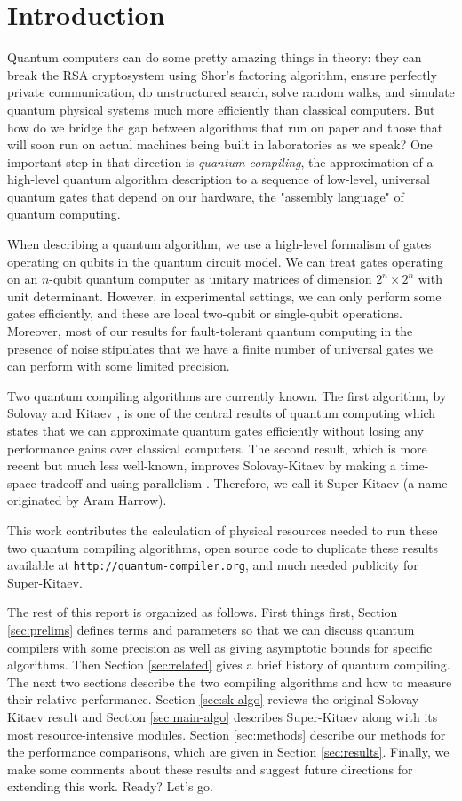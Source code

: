 \section{Introduction}

Quantum computers can do some pretty amazing things in theory: they
can break the RSA cryptosystem using Shor's factoring algorithm,
ensure perfectly private communication,
do unstructured search, solve random walks, and
simulate quantum physical systems much more efficiently than classical
computers. But how
do we bridge the gap between algorithms that run on paper and those that
will soon run on actual machines being built in laboratories as we speak?
One important step in that direction is \emph{quantum compiling}, the
approximation of a high-level quantum algorithm description to a sequence
of low-level, universal quantum gates that depend on our hardware, the
"assembly language" of quantum computing.

When describing a quantum algorithm, we use a high-level formalism of
gates operating on qubits in the quantum circuit model.
We can treat gates operating on an $n$-qubit quantum computer as unitary
matrices of dimension $2^n \times 2^n$ with unit determinant.
However, in experimental settings,
we can only perform some gates efficiently, and these are local
two-qubit or single-qubit operations.
Moreover, most of our results for fault-tolerant
quantum computing in the presence of noise stipulates that we have a finite
number of universal gates we can perform with some limited precision.

Two quantum compiling algorithms are currently known. The first algorithm,
by Solovay and Kitaev \cite{Dawson2005},
is one of the central results of quantum computing which states that we
can approximate quantum gates efficiently without losing any performance
gains over classical computers.
The second result, which is more recent but much less well-known, improves
Solovay-Kitaev by making a time-space tradeoff and using parallelism
\cite{ksv02}.
Therefore, we call it Super-Kitaev (a name originated by Aram Harrow).

This work contributes the calculation of physical resources needed
to run these two quantum compiling algorithms, open source code to duplicate
these results available at \texttt{http://quantum-compiler.org},
and much needed publicity for Super-Kitaev.

The rest of this report is organized as follows.
First things first, Section \ref{sec:prelims} defines terms and parameters
so that we can discuss quantum compilers with some precision as well as
giving asymptotic bounds for specific algorithms.
Then Section
\ref{sec:related} gives a brief history of quantum compiling.
The next two sections describe the two compiling algorithms and how
to measure their relative performance.
Section \ref{sec:sk-algo} reviews the original Solovay-Kitaev result and
Section \ref{sec:main-algo} describes Super-Kitaev along with its
most resource-intensive modules. Section \ref{sec:methods} describe
our methods for the performance comparisons, which are given in Section
\ref{sec:results}. Finally, we make some comments about these results
and suggest future directions for extending this work. Ready? Let's go.
